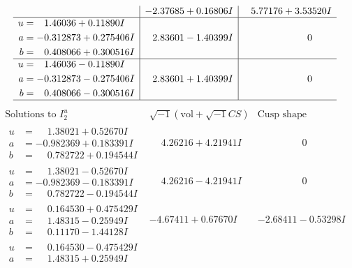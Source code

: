 \documentclass[1p]{elsarticle_modified}
\theoremstyle{definition}
\newcommand{\I}{\sqrt{-1}}
\begin{document}
$$\begin{array}{c|c|c}
 & -2.37685 + 0.16806 I & \phantom{-}5.77176 + 3.53520 I \\ \hline\begin{aligned}
u &= \phantom{-}1.46036 + 0.11890 I \\
a &= -0.312873 + 0.275406 I \\
b &= \phantom{-}0.408066 + 0.300516 I\end{aligned}
 & \phantom{-}2.83601 - 1.40399 I & \phantom{-0.000000 } 0 \\ \hline\begin{aligned}
u &= \phantom{-}1.46036 - 0.11890 I \\
a &= -0.312873 - 0.275406 I \\
b &= \phantom{-}0.408066 - 0.300516 I\end{aligned}
 & \phantom{-}2.83601 + 1.40399 I & \phantom{-0.000000 } 0\\
 \hline 
 \end{array}$$\newpage$$\begin{array}{c|c|c}  
\text{Solutions to }I^u_{2}& \I (\text{vol} + \sqrt{-1}CS) & \text{Cusp shape}\\
 \hline 
\begin{aligned}
u &= \phantom{-}1.38021 + 0.52670 I \\
a &= -0.982369 + 0.183391 I \\
b &= \phantom{-}0.782722 + 0.194544 I\end{aligned}
 & \phantom{-}4.26216 + 4.21941 I & \phantom{-0.000000 } 0 \\ \hline\begin{aligned}
u &= \phantom{-}1.38021 - 0.52670 I \\
a &= -0.982369 - 0.183391 I \\
b &= \phantom{-}0.782722 - 0.194544 I\end{aligned}
 & \phantom{-}4.26216 - 4.21941 I & \phantom{-0.000000 } 0 \\ \hline\begin{aligned}
u &= \phantom{-}0.164530 + 0.475429 I \\
a &= \phantom{-}1.48315 - 0.25949 I \\
b &= \phantom{-}0.11170 - 1.44128 I\end{aligned}
 & -4.67411 + 0.67670 I & -2.68411 - 0.53298 I \\ \hline\begin{aligned}
u &= \phantom{-}0.164530 - 0.475429 I \\
a &= \phantom{-}1.48315 + 0.25949 I \\

\end{aligned}
\end{array}$$
\end{document}
